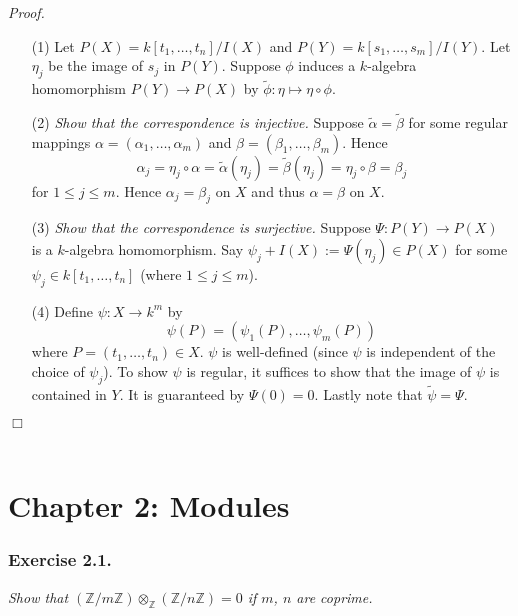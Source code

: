 \documentclass{article}
\begin{document}
\emph{Proof.}
\begin{enumerate}
\item[(1)]
  Let $P(X) = k[t_1, \ldots, t_n]/I(X)$ and $P(Y) = k[s_1, \ldots, s_m]/I(Y)$.
  Let $\eta_j$ be the image of $s_j$ in $P(Y)$.
  Suppose $\phi$ induces a $k$-algebra homomorphism $P(Y) \to P(X)$ by
  $\widetilde{\phi}: \eta \mapsto \eta \circ \phi$.

\item[(2)]
  \emph{Show that the correspondence is injective.}
  Suppose $\widetilde{\alpha} = \widetilde{\beta}$ for some regular mappings
  $\alpha = (\alpha_1, \ldots, \alpha_m)$ and $\beta = (\beta_1, \ldots, \beta_m)$.
  Hence
  \[
    \alpha_j
    = \eta_j \circ \alpha
    = \widetilde{\alpha}(\eta_j)
    = \widetilde{\beta}(\eta_j)
    = \eta_j \circ \beta
    = \beta_j
  \]
  for $1 \leq j \leq m$.
  Hence $\alpha_j = \beta_j$ on $X$ and thus $\alpha = \beta$ on $X$.

\item[(3)]
  \emph{Show that the correspondence is surjective.}
  Suppose $\Psi: P(Y) \to P(X)$ is a $k$-algebra homomorphism.
  Say $\psi_j + I(X) := \Psi(\eta_j) \in P(X)$ for some $\psi_j \in k[t_1, \ldots, t_n]$
  (where $1 \leq j \leq m$).

\item[(4)]
  Define $\psi: X \to k^m$ by
  \[
    \psi(P) = (\psi_1(P), \ldots, \psi_m(P))
  \]
  where $P = (t_1, \ldots, t_n) \in X$.
  $\psi$ is well-defined (since $\psi$ is independent of the choice of $\psi_j$).
  To show $\psi$ is regular, it suffices to show that the image of $\psi$ is contained in $Y$.
  It is guaranteed by $\Psi(0) = 0$.
  Lastly note that $\widetilde{\psi} = \Psi$.
\end{enumerate}
$\Box$ \\\\






\newpage
\section*{Chapter 2: Modules \\}



\subsubsection*{Exercise 2.1.}
\emph{Show that
$(\mathbb{Z}/m\mathbb{Z}) \otimes_{\mathbb{Z}} (\mathbb{Z}/n\mathbb{Z}) = 0$
if $m$, $n$ are coprime.} \\
\end{document}
